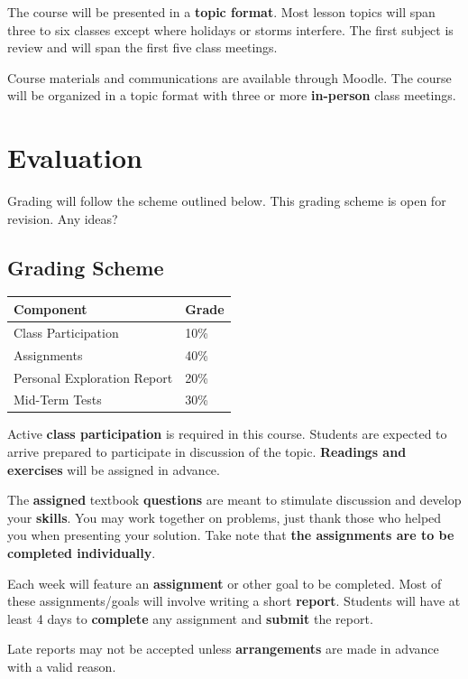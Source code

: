 The course will be presented in a \textbf{topic format}. Most lesson topics will span three to six classes except where holidays or storms interfere. The first subject is review and will span the first five class meetings.

Course materials and communications are available through Moodle. The course will be organized in a topic format with three or more \textbf{in-person} class meetings.

\section{Evaluation}

Grading will follow the scheme outlined below. This grading scheme is open for revision. Any ideas?

\subsection{Grading Scheme}

\begin{center}
\begin{tabular}{ll}
\hline
Component & Grade \\
\hline
Class Participation & 10\% \\
Assignments & 40\% \\
Personal Exploration Report & 20\% \\
Mid-Term Tests & 30\% \\
\hline
\end{tabular}
\end{center}

Active \textbf{class participation} is required in this course. Students are expected to arrive prepared to participate in discussion of the topic. \textbf{Readings and exercises} will be assigned in advance.

The \textbf{assigned} textbook \textbf{questions} are meant to stimulate discussion and develop your \textbf{skills}. You may work together on problems, just thank those who helped you when presenting your solution. Take note that \textbf{the assignments are to be completed individually}.

Each week will feature an \textbf{assignment} or other goal to be completed. Most of these assignments/goals will involve writing a short \textbf{report}. Students will have at least 4 days to \textbf{complete} any assignment and \textbf{submit} the report.

Late reports may not be accepted unless \textbf{arrangements} are made in advance with a valid reason.

